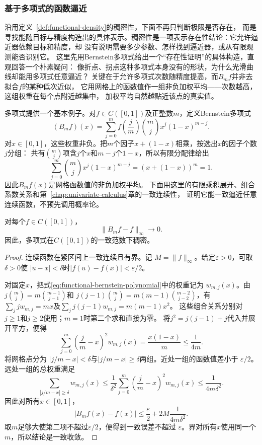 \subsubsection{基于多项式的函数逼近}
\label{sec:functional-polynomial-approximation}

沿用定义~\ref{def:functional-density}的稠密性，下面不再只判断极限是否存在，
而是寻找能随目标与精度构造出的具体表示。稠密性是一项表示存在性结论：它允许逼近器依赖目标和精度，却
没有说明需要多少参数、怎样找到逼近器，或从有限观测能否识别它。
这里先用Bernstein多项式给出一个“存在性证明”的具体构造，直观回答一个朴素疑问：
像折点、拐点这种多项式本身没有的形状，为什么光滑曲线却能用多项式任意逼近？
关键在于允许多项式次数随精度提高，而$B_mf$并非去拟合$f$的某种低次近似，
它用网格上的函数值作一组非负加权平均——次数越高，这组权重在每个点附近越集中，
加权平均自然越贴近该点的真实值。

多项式提供一个基本例子。对$f\in C([0,1])$及正整数$m$，定义Bernstein多项式
\begin{equation}
  (B_mf)(x)
  =
  \sum_{j=0}^{m}
  f\left(\frac{j}{m}\right)
\binom{m}{j}x^j(1-x)^{m-j}.
  \label{eq:functional-bernstein-polynomial}
\end{equation}
对$x\in[0,1]$，这些权重非负。把$m$个因子$x+(1-x)$相乘，按选出$x$的因子个数$j$分组：
共有$\binom mj$项含$j$个$x$和$m-j$个$1-x$，所以有限分配律给出
\[
 \sum_{j=0}^m\binom mj x^j(1-x)^{m-j}=(x+(1-x))^m=1.
\]
因此$B_mf(x)$是网格函数值的非负加权平均。
下面用这里的有限乘积展开、组合系数关系和第~\ref{chap:univariate-calculus}章的一致连续性，
证明它能一致逼近任意连续函数，不预先调用概率论。

\begin{theorem}[Bernstein逼近定理]
\label{thm:functional-weierstrass-bernstein}
对每个$f\in C([0,1])$，
\[
  \lVert B_mf-f\rVert_{\infty}\longrightarrow0.
\]
因此，多项式在$C([0,1])$的一致范数下稠密。
\end{theorem}

\begin{proof}
连续函数在紧区间上一致连续且有界。记
$M=\lVert f\rVert_{\infty}$。给定$\varepsilon>0$，可取$\delta>0$使
$|u-x|<\delta$时$|f(u)-f(x)|<\varepsilon/2$。

对固定$x$，把式\eqref{eq:functional-bernstein-polynomial}中的权重记为
$w_{m,j}(x)$。由$j\binom mj=m\binom{m-1}{j-1}$和
$j(j-1)\binom mj=m(m-1)\binom{m-2}{j-2}$，有
$\sum_jj w_{m,j}=mx$及$\sum_jj(j-1)w_{m,j}=m(m-1)x^2$。
这些组合关系分别对$j\geq1$和$j\geq2$使用；$m=1$时第二个求和直接为零。
将$j^2=j(j-1)+j$代入并展开平方，便得
\[
  \sum_{j=0}^{m}
  \left(\frac{j}{m}-x\right)^2w_{m,j}(x)
  =
  \frac{x(1-x)}{m}
  \leq\frac{1}{4m}.
\]
将网格点分为
$|j/m-x|<\delta$与$|j/m-x|\geq\delta$两组。近处一组的函数值差小于
$\varepsilon/2$。远处一组的总权重满足
\[
  \sum_{|j/m-x|\geq\delta}w_{m,j}(x)
  \leq
  \frac{1}{\delta^2}
  \sum_{j=0}^{m}
  \left(\frac{j}{m}-x\right)^2w_{m,j}(x)
  \leq\frac{1}{4m\delta^2}.
\]
因此对所有$x\in[0,1]$，
\[
  |B_mf(x)-f(x)|
  \leq
  \frac{\varepsilon}{2}
  +
  2M\frac{1}{4m\delta^2}.
\]
取$m$足够大使第二项不超过$\varepsilon/2$，便得到一致误差不超过
$\varepsilon$。界对所有$x$使用同一个$m$，所以结论是一致收敛。
\end{proof}

